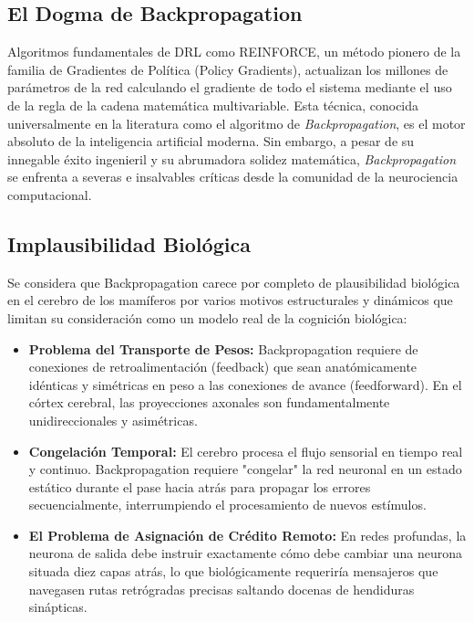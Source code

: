 \documentclass[a4paper,12pt,twocolumn]{article}
\begin{document}
\subsection{El Dogma de Backpropagation}
Algoritmos fundamentales de DRL como REINFORCE, un método pionero de la familia de Gradientes de Política (Policy Gradients), actualizan los millones de parámetros de la red calculando el gradiente de todo el sistema mediante el uso de la regla de la cadena matemática multivariable. Esta técnica, conocida universalmente en la literatura como el algoritmo de \textit{Backpropagation}, es el motor absoluto de la inteligencia artificial moderna. Sin embargo, a pesar de su innegable éxito ingenieril y su abrumadora solidez matemática, \textit{Backpropagation} se enfrenta a severas e insalvables críticas desde la comunidad de la neurociencia computacional.

\subsection{Implausibilidad Biológica}
Se considera que Backpropagation carece por completo de plausibilidad biológica en el cerebro de los mamíferos por varios motivos estructurales y dinámicos que limitan su consideración como un modelo real de la cognición biológica:
\begin{itemize}
    \item \textbf{Problema del Transporte de Pesos:} Backpropagation requiere de conexiones de retroalimentación (feedback) que sean anatómicamente idénticas y simétricas en peso a las conexiones de avance (feedforward). En el córtex cerebral, las proyecciones axonales son fundamentalmente unidireccionales y asimétricas.
    \item \textbf{Congelación Temporal:} El cerebro procesa el flujo sensorial en tiempo real y continuo. Backpropagation requiere "congelar" la red neuronal en un estado estático durante el pase hacia atrás para propagar los errores secuencialmente, interrumpiendo el procesamiento de nuevos estímulos.
    \item \textbf{El Problema de Asignación de Crédito Remoto:} En redes profundas, la neurona de salida debe instruir exactamente cómo debe cambiar una neurona situada diez capas atrás, lo que biológicamente requeriría mensajeros que navegasen rutas retrógradas precisas saltando docenas de hendiduras sinápticas.
\end{itemize}
\end{document}
